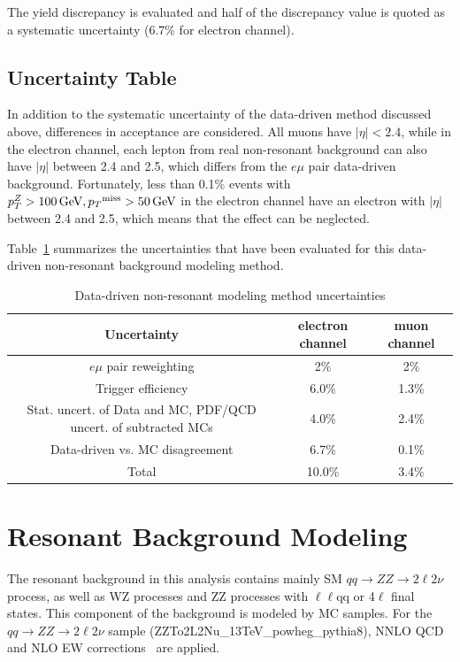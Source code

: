 \vspace{0.3cm}
The yield discrepancy is evaluated and half of the discrepancy value is quoted as a systematic uncertainty (6.7\% for electron channel).

\subsection{Uncertainty Table}
In addition to the systematic uncertainty of the data-driven method discussed above, differences in acceptance are considered. All muons have $|\eta|<2.4$, while in the electron channel, each lepton from real non-resonant background can also have $|\eta|$ between 2.4 and 2.5, which differs from the $e\mu$ pair data-driven background. Fortunately, less than 0.1\% events with $p_{T}^{Z}>100\,\text{Ge\hspace{-.08em}V}, {p_T}^\text{miss} >50\,\text{Ge\hspace{-.08em}V}$ in the electron channel have an electron with $|\eta|$ between 2.4 and 2.5, which means that the effect can be neglected. 

\vspace{0.3cm}
Table~\ref{tab:nonresuncert} summarizes the uncertainties that have been evaluated for this data-driven non-resonant background modeling method.
\begin{table}[htbp]
\begin{small}
  \begin{center}
    \caption{
      Data-driven non-resonant modeling method uncertainties
      \label{tab:nonresuncert}}
    \begin{tabular}{c|c c}
      \hline\hline
      Uncertainty & electron channel & muon channel \\
      \hline
      $e\mu$ pair reweighting & 2\% & 2\% \\
      Trigger efficiency & 6.0\% & 1.3\% \\
      Stat. uncert. of Data and MC, PDF/QCD uncert. of subtracted MCs  & 4.0\% & 2.4\% \\
      Data-driven vs. MC disagreement & 6.7\% & 0.1\% \\
      \hline
      Total  & 10.0\% & 3.4\% \\
      \hline\hline
    \end{tabular}
  \end{center}
\end{small}
\end{table}

\clearpage
\section{Resonant Background Modeling}
The resonant background in this analysis contains mainly SM $qq\rightarrow ZZ\rightarrow 2\ell 2\nu$ process, as well as WZ processes and ZZ processes with $\ell\ell$qq or 4$\ell$ final states. This component of the background is modeled by MC samples. For the $qq\rightarrow ZZ\rightarrow 2\ell 2\nu$ sample (ZZTo2L2Nu\_13TeV\_powheg\_pythia8), NNLO QCD~\cite{bg_nnloqcd} and NLO EW corrections~\cite{bg_nloqed1,bg_nloqed2} are applied.

